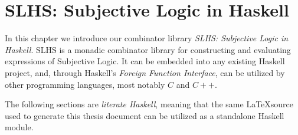 \documentclass[thesis.tex]{subfiles}
\begin{document}
\chapter{SLHS: Subjective Logic in Haskell}

In this chapter we introduce our combinator library \emph{SLHS: Subjective Logic
in Haskell}. SLHS is a monadic combinator library for constructing and evaluating
expressions of Subjective Logic. It can be embedded into any existing Haskell
project, and, through Haskell's \emph{Foreign Function Interface}, can be utilized
by other programming languages, most notably $C$ and $C++$.

The following sections are \emph{literate Haskell}, meaning that the same
\LaTeX source used to generate this thesis document can be utilized as a standalone
Haskell module.





\end{document}
